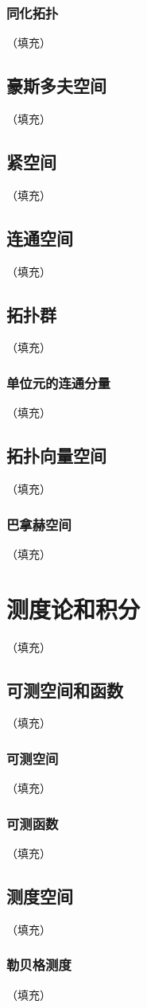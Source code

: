 \documentclass[hyperref,UTF8]{ctexbook}
\begin{document}
\subsection{同化拓扑}（填充）
\section{豪斯多夫空间}（填充）
\section{紧空间}（填充）
\section{连通空间}（填充）
\section{拓扑群}（填充）
\subsection{单位元的连通分量}（填充）
\section{拓扑向量空间}（填充）
\subsection{巴拿赫空间}（填充）
\chapter{测度论和积分}（填充）
\section{可测空间和函数}（填充）
\subsection{可测空间}（填充）
\subsection{可测函数}（填充）
\section{测度空间}（填充）
\subsection{勒贝格测度}（填充）
\end{document}
